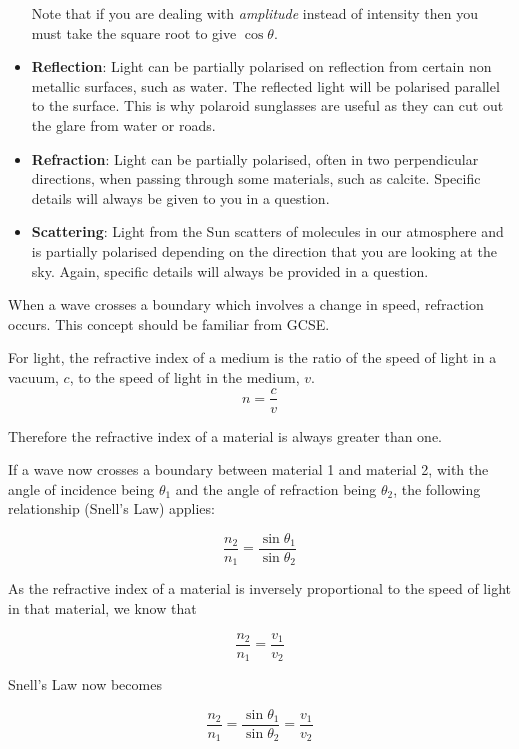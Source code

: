 \documentclass[main.tex]{subfiles}
\begin{document}
\begin{itemize}
Note that if you are dealing with \emph{amplitude} instead of intensity then you must take the square root to give $\cos\theta$.

\item\textbf{Reflection}: Light can be partially polarised on reflection from certain non metallic surfaces, such as water. The reflected light will be polarised parallel to the surface. This is why polaroid sunglasses are useful as they can cut out the glare from water or roads.

\item\textbf{Refraction}: Light can be partially polarised, often in two perpendicular directions, when passing through some materials, such as calcite. Specific details will always be given to you in a question.

\item\textbf{Scattering}: Light from the Sun scatters of molecules in our atmosphere and is partially polarised depending on the direction that you are looking at the sky. Again, specific details will always be provided in a question.

\end{itemize}


When a wave crosses a boundary which involves a change in speed, refraction occurs. This concept should be familiar from GCSE.


For light, the refractive index of a medium is the ratio of the speed of light in a vacuum, $c$, to the speed of light in the medium, $v$.
\[n = \frac{c}{v}\]

Therefore the refractive index of a material is always greater than one.

If a wave now crosses a boundary between material 1 and material 2, with the angle of incidence being $\theta_1$ and the angle of refraction being $\theta_2$, the following relationship (Snell's Law) applies:

\[ \frac{n_2}{n_1} = \frac{\sin{\theta_1}}{\sin{\theta_2}}\]

As the refractive index of a material is inversely proportional to the speed of light in that material, we know that

\[\frac{n_2}{n_1} = \frac{v_1}{v_2} \]

Snell's Law now becomes

\[ \frac{n_2}{n_1} = \frac{\sin{\theta_1}}{\sin{\theta_2}} =  \frac{v_1}{v_2}\]
\end{document}
